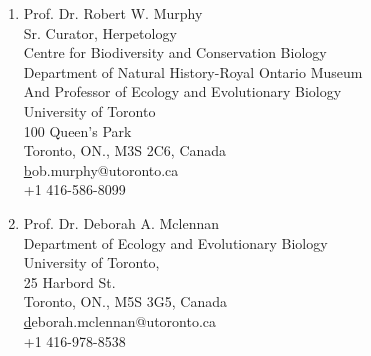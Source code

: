 \documentclass[11pt]{article}
\begin{document}
\begin{enumerate}
\item Prof. Dr. Robert W. Murphy\\Sr. Curator, Herpetology\\Centre for Biodiversity and Conservation Biology\\Department of Natural History-Royal Ontario Museum\\And Professor of Ecology and Evolutionary Biology\\ University of Toronto\\100 Queen’s Park\\Toronto, ON., M3S 2C6, Canada\\\href{bob.murphy@utoronto.ca}bob.murphy@utoronto.ca\\+1 416-586-8099

\item Prof. Dr. Deborah A. Mclennan\\Department of Ecology and Evolutionary Biology\\University of Toronto,\\25 Harbord St.\\Toronto, ON., M5S 3G5, Canada \\\href{deborah.mclennan@utoronto.ca}deborah.mclennan@utoronto.ca\\+1 416-978-8538
\end{enumerate}
\end{document}
